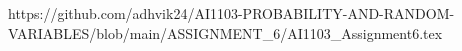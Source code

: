https://github.com/adhvik24/AI1103-PROBABILITY-AND-RANDOM-VARIABLES/blob/main/ASSIGNMENT_6/AI1103_Assignment6.tex
